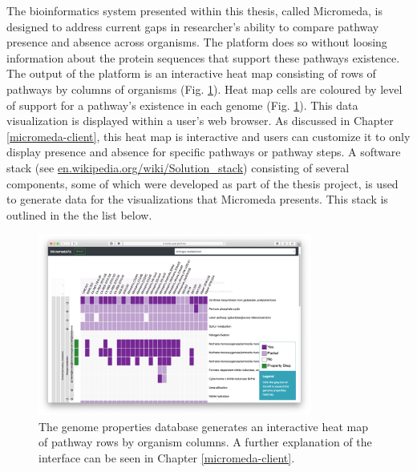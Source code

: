 The bioinformatics system presented within this thesis, called Micromeda, is designed to address current gaps in researcher's ability to compare pathway presence and absence across organisms. The platform does so without loosing information about the protein sequences that support these pathways existence. The output of the platform is an interactive heat map consisting of rows of pathways by columns of organisms (Fig. \ref{fig:basic-heatmap-overview}). Heat map cells are coloured by level of support for a pathway's existence in each genome (Fig. \ref{fig:basic-heatmap-overview}). This data visualization is displayed within a user's web browser. As discussed in Chapter \ref{micromeda-client}, this heat map is interactive and users can customize it to only display presence and absence for specific pathways or pathway steps. A software stack (see \href{en.wikipedia.org/wiki/Solution\_stack}{en.wikipedia.org/wiki/Solution\_stack}) consisting of several components, some of which were developed as part of the thesis project, is used to generate data for the visualizations that Micromeda presents. This stack is outlined in the the list below.

\begin{figure}[!ht]
  \centering
	\includegraphics[width=0.8\textwidth]{media/Micromeda-Simple-Overview.png}
	 \caption{The genome properties database generates an interactive heat map of pathway rows by organism columns. A further explanation of the interface can be seen in Chapter \ref{micromeda-client}.}
	 \label{fig:basic-heatmap-overview}
\end{figure}

